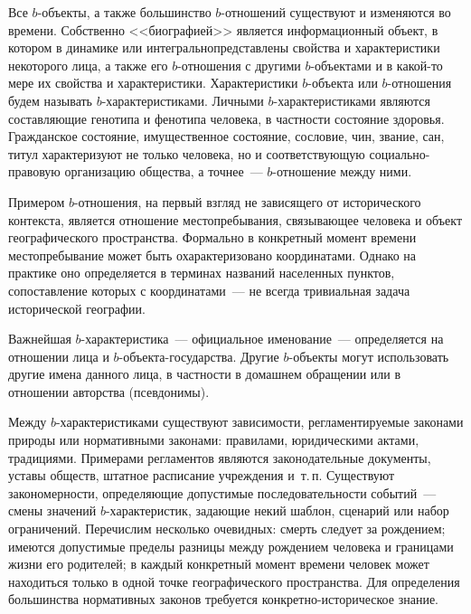 \begin{multicols}{2}
  Все $b$-объекты, а также большинство $b$-от\-но\-ше\-ний существуют и 
изменяются во времени. Собственно <<биографией>> является 
информационный объект, в котором в динамике или интегрально\linebreak представлены 
свойства и характеристики некоторого лица, а также его $b$-отношения с 
другими\linebreak
 $b$-объек\-та\-ми и в какой-то мере их свойства и характеристики. 
Характеристики $b$-объек\-та или $b$-от\-но\-ше\-ния будем называть 
  $b$-ха\-рак\-те\-ри\-сти\-ка\-ми. Личными $b$-ха\-рак\-те\-ри\-сти\-ка\-ми являются 
составляющие генотипа и фенотипа человека, в частности состояние здоровья. 
Гражданское состояние, имущественное состояние, сословие, чин, звание, сан, 
титул характеризуют не только человека, но и соответствующую социально-правовую 
организацию общества, а точнее~--- $b$-от\-но\-ше\-ние между ними.
  
  Примером $b$-отношения, на первый взгляд не зависящего от исторического 
контекста, является отношение местопребывания, связывающее человека и 
объект географического пространства. Формально в конкретный момент 
времени местопребывание может быть охарактеризовано координатами. 
Однако на практике оно определяется в терминах названий населенных 
пунктов, сопоставление которых с координатами~--- не всегда тривиальная 
задача исторической географии.
  
  Важнейшая $b$-характеристика~--- официальное именование~--- 
определяется на отношении лица и $b$-объекта-государства. 
Другие $b$-объекты могут использовать другие имена данного лица, в част\-ности в 
домашнем обращении или в отношении авторства (псевдонимы).
  
  Между $b$-характеристиками существуют зависимости, регламентируемые 
законами природы или нормативными законами: правилами, юридическими 
актами, традициями. Примерами регламентов являются законодательные 
документы, уставы обществ, штатное расписание учреждения и~т.\,п. 
Существуют закономерности, определяющие до\-пус\-ти\-мые последовательности 
событий~--- смены значений $b$-характеристик, задающие некий шаб\-лон, 
сценарий или набор ограничений. Перечислим несколько очевидных: смерть 
следует за рож\-де\-ни\-ем; имеются допустимые пределы разницы между 
рождением человека и границами жизни его родителей; в каждый конкретный 
момент времени человек может находиться только в одной точке 
географического пространства. Для определения большинства нормативных 
законов требуется конкретно-историческое знание.


\end{multicols}
